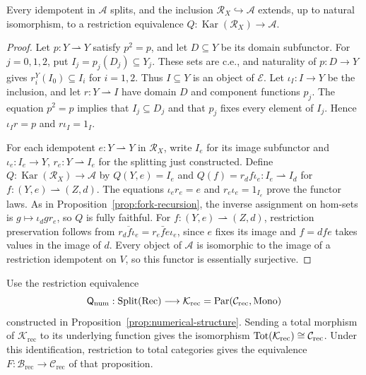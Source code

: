 \begin{corollary}\label{cor:fork-karoubi}
Every idempotent in $\mathcal A$ splits, and the inclusion
$\mathscr R_X\hookrightarrow\mathcal A$ extends, up to natural
isomorphism, to a restriction equivalence
$Q:\operatorname{Kar}(\mathscr R_X)\to\mathcal A$.
\end{corollary}
\begin{proof}
Let $p:Y\rightharpoonup Y$ satisfy $p^2=p$, and let
$D\subseteq Y$ be its domain subfunctor. For $j=0,1,2$, put
$I_j=p_j(D_j)\subseteq Y_j$. These sets are c.e., and naturality
of $p:D\to Y$ gives $r_i^Y(I_0)\subseteq I_i$ for $i=1,2$.
Thus $I\subseteq Y$ is an object of $\mathcal E$.
Let $\iota_I:I\to Y$ be the inclusion, and let
$r:Y\rightharpoonup I$ have domain $D$ and component functions $p_j$.
The equation $p^2=p$ implies that $I_j\subseteq D_j$ and that
$p_j$ fixes every element of $I_j$. Hence $\iota_I r=p$ and $r\iota_I=1_I$.

For each idempotent $e:Y\rightharpoonup Y$ in $\mathscr R_X$, write
$I_e$ for its image subfunctor and
$\iota_e:I_e\to Y$, $r_e:Y\rightharpoonup I_e$ for the splitting just
constructed. Define
$Q:\operatorname{Kar}(\mathscr R_X)\to\mathcal A$ by
$Q(Y,e)=I_e$ and
$Q(f)=r_d f \iota_e:I_e\rightharpoonup I_d$ for
$f:(Y,e)\rightharpoonup(Z,d)$.
The equations $\iota_er_e=e$ and $r_e\iota_e=1_{I_e}$ prove the functor
laws. As in Proposition~\ref{prop:fork-recursion}, the inverse
assignment on hom-sets is $g\mapsto \iota_d g r_e$, so $Q$ is fully faithful.
For $f:(Y,e)\rightharpoonup(Z,d)$, restriction preservation follows from
$\overline{r_d f \iota_e}=r_e\bar f e \iota_e$, since $e$ fixes its image
and $f=dfe$ takes values in the image of $d$.
Every object of $\mathcal A$ is isomorphic to the image of a restriction
idempotent on $V$, so this functor is essentially surjective.
\end{proof}

Use the restriction equivalence
\[
 \mathsf Q_{\mathrm{num}}:\operatorname{Split}(\mathrm{Rec})
       \longrightarrow\mathcal K_{\mathrm{rec}}
       =\operatorname{Par}(\mathcal C_{\mathrm{rec}},\operatorname{Mono})
\]
constructed in Proposition~\ref{prop:numerical-structure}.
Sending a total morphism of $\mathcal K_{\mathrm{rec}}$ to its underlying
function gives the isomorphism
$\operatorname{Tot}(\mathcal K_{\mathrm{rec}})\cong\mathcal C_{\mathrm{rec}}$.
Under this identification, restriction to total categories gives the
equivalence $F:\mathcal B_{\mathrm{rec}}\to\mathcal C_{\mathrm{rec}}$
of that proposition.

